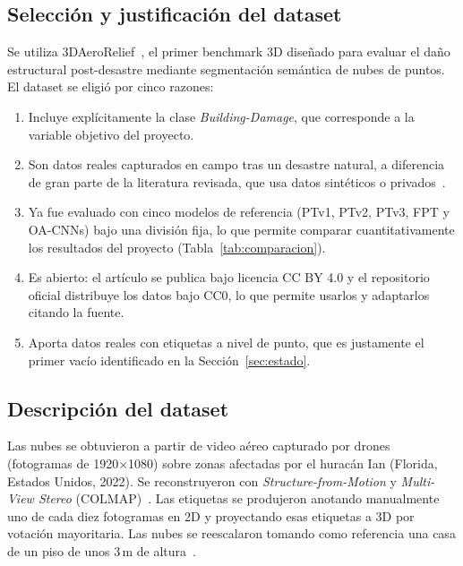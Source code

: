 \documentclass[5p]{elsarticle}
\begin{document}
\subsection{Selección y justificación del dataset}

Se utiliza 3DAeroRelief~\cite{Le2026}, el primer benchmark 3D diseñado para evaluar el daño estructural post-desastre mediante segmentación semántica de nubes de puntos. El dataset se eligió por cinco razones:
\begin{enumerate}
    \item Incluye explícitamente la clase \emph{Building-Damage}, que corresponde a la variable objetivo del proyecto.
    \item Son datos reales capturados en campo tras un desastre natural, a diferencia de gran parte de la literatura revisada, que usa datos sintéticos o privados~\cite{Zahs2023,Jing2024}.
    \item Ya fue evaluado con cinco modelos de referencia (PTv1, PTv2, PTv3, FPT y OA-CNNs) bajo una división fija, lo que permite comparar cuantitativamente los resultados del proyecto (Tabla~\ref{tab:comparacion}).
    \item Es abierto: el artículo se publica bajo licencia CC BY 4.0 y el repositorio oficial distribuye los datos bajo CC0, lo que permite usarlos y adaptarlos citando la fuente.
    \item Aporta datos reales con etiquetas a nivel de punto, que es justamente el primer vacío identificado en la Sección~\ref{sec:estado}.
\end{enumerate}

\subsection{Descripción del dataset}

Las nubes se obtuvieron a partir de video aéreo capturado por drones (fotogramas de 1920$\times$1080) sobre zonas afectadas por el huracán Ian (Florida, Estados Unidos, 2022). Se reconstruyeron con \emph{Structure-from-Motion} y \emph{Multi-View Stereo} (COLMAP)~\cite{Le2026}. Las etiquetas se produjeron anotando manualmente uno de cada diez fotogramas en 2D y proyectando esas etiquetas a 3D por votación mayoritaria. Las nubes se reescalaron tomando como referencia una casa de un piso de unos 3\,m de altura~\cite{Le2026}.
\end{document}
